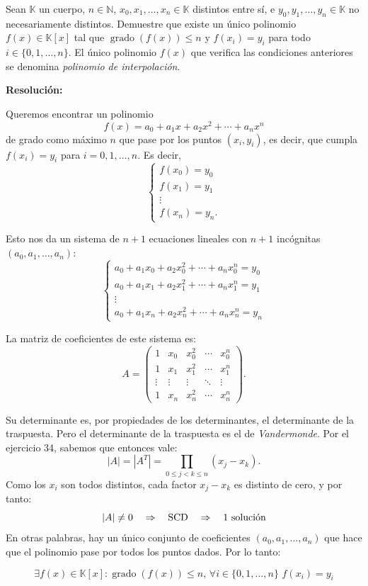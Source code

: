 \documentclass[a4paper,12pt]{article}
\begin{document}
\begin{ejercicio}[title=Ejercicio 37 (⋆)]
Sean $\mathbb{K}$ un cuerpo, $n \in \mathbb{N}$, $x_0,x_1,\ldots,x_n \in \mathbb{K}$ distintos entre sí, e $y_0,y_1,\ldots,y_n \in \mathbb{K}$ no necesariamente distintos.  
Demuestre que existe un único polinomio $f(x) \in \mathbb{K}[x]$ tal que $\operatorname{grado}(f(x)) \le n$ y $f(x_i) = y_i$ para todo $i \in \{0,1,\ldots,n\}$.  
El único polinomio $f(x)$ que verifica las condiciones anteriores se denomina \textit{polinomio de interpolación}.

\tcblower
\textbf{Resolución:}

Queremos encontrar un polinomio 
\[
f(x) = a_0 + a_1 x + a_2 x^2 + \cdots + a_n x^n
\]
de grado como máximo $n$ que pase por los puntos $(x_i, y_i)$, es decir, que cumpla $f(x_i) = y_i$ para $i=0,1,\dots,n$. Es decir,
\[
\begin{cases}
f(x_0) = y_0\\
f(x_1) = y_1\\
\vdots\\
f(x_n) = y_n.
\end{cases}
\]

Esto nos da un sistema de $n+1$ ecuaciones lineales con $n+1$ incógnitas $(a_0, a_1, \dots, a_n)$:
\[
\begin{cases}
a_0 + a_1 x_0 + a_2 x_0^2 + \cdots + a_n x_0^n = y_0\\
a_0 + a_1 x_1 + a_2 x_1^2 + \cdots + a_n x_1^n = y_1\\
\vdots\\
a_0 + a_1 x_n + a_2 x_n^2 + \cdots + a_n x_n^n = y_n
\end{cases}
\]

La matriz de coeficientes de este sistema es:
\[
A =
\begin{pmatrix}
1 & x_0 & x_0^2 & \cdots & x_0^n \\
1 & x_1 & x_1^2 & \cdots & x_1^n \\
\vdots & \vdots & \vdots & \ddots & \vdots \\
1 & x_n & x_n^2 & \cdots & x_n^n
\end{pmatrix}.
\]

Su determinante es, por propiedades de los determinantes, el determinante de la traspuesta. Pero el determinante de la traspuesta es el de \textit{Vandermonde}. Por el ejercicio 34, sabemos que entonces vale:
\[
|A| = |A^T| = \prod_{0 \le j < k \le n} (x_j - x_k).
\]
Como los $x_i$ son todos distintos, cada factor $x_j - x_k$ es distinto de cero, y por tanto:
\[
\scalebox{1}{$
|A| \neq 0 \quad \Rightarrow \quad \text{SCD} \quad \Rightarrow \quad \text{1 solución}
$}
\]
En otras palabras, hay un único conjunto de coeficientes $(a_0, a_1, \dots, a_n)$ que hace que el polinomio pase por todos los puntos dados. Por lo tanto:

\[
\boxed{\exists f(x) \in \mathbb{K}[x]: \operatorname{grado}(f(x)) \le n,\,\forall i \in \{0,1,\ldots,n\}\,\, f(x_i) = y_i}
\]

\end{ejercicio}
\end{document}
